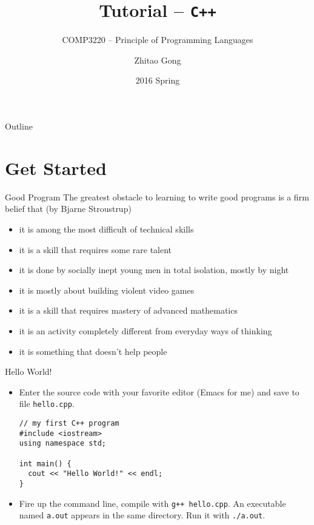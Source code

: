 \documentclass[presentation]{beamer}
\author{Zhitao Gong}
\date{2016 Spring}
\title{Tutorial -- \texttt{C++}}
\subtitle{COMP3220 -- Principle of Programming Languages}
\begin{document}
\maketitle
\begin{frame}{Outline}
\setcounter{tocdepth}{2}
\tableofcontents
\end{frame}


\section{Get Started}
\label{sec:orgheadline12}

\begin{frame}[label={sec:orgheadline1}]{Good Program}
The greatest obstacle to learning to write good programs is a firm
belief that (by Bjarne Stroustrup)

\begin{itemize}
\item it is among the most difficult of technical skills
\item it is a skill that requires some rare talent
\item it is done by socially inept young men in total isolation, mostly
by night
\item it is mostly about building violent video games
\item it is a skill that requires mastery of advanced mathematics
\item it is an activity completely different from everyday ways of
thinking
\item it is something that doesn't help people
\end{itemize}
\end{frame}

\begin{frame}[fragile,label={sec:orgheadline2}]{Hello World!}
 \begin{itemize}
\item Enter the source code with your favorite editor (Emacs for me)
and save to file \texttt{hello.cpp}.

\begin{verbatim}
// my first C++ program
#include <iostream>
using namespace std;

int main() {
  cout << "Hello World!" << endl;
}
\end{verbatim}

\item Fire up the command line, compile with \texttt{g++ hello.cpp}.  An
executable named \texttt{a.out} appears in the same directory.  Run it
with \texttt{./a.out}.
\end{itemize}
\end{frame}
\end{document}
